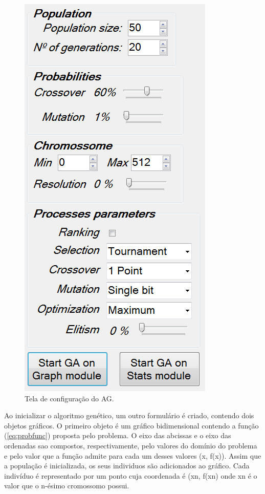 \documentclass[twoside]{article}
\begin{document}
\begin{multicols}{2}
\begin{figure}[H]
\label{fig:userview}
  \caption{Tela de configuração do AG.}
  \centering
    \includegraphics[scale = 0.45]{user_view.png}
\end{figure}

Ao inicializar o algoritmo genético, um outro formulário é criado, contendo dois objetos gráficos. O primeiro objeto é um gráfico bidimensional contendo a função (\ref{eq:probfunc}) proposta pelo problema. O eixo das abcissas e o eixo das ordenadas sao compostos, respectivamente, pelo valores do domínio do problema e pelo valor que a função admite para cada um desses valores (x, f(x)). Assim que a população é inicializada, os seus individuos são adicionados ao gráfico. Cada indivíduo é representado por um ponto cuja coordenada é (xn, f(xn) onde xn é o valor que o n-ésimo cromossomo possui. 


\end{multicols}
\end{document}
